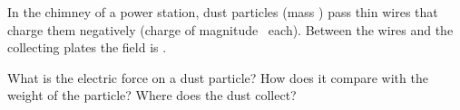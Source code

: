 In the chimney of a power station, dust particles (mass \mO) pass thin wires that charge them negatively (charge of magnitude \qO\ each). Between the wires and the collecting plates the field is \EO.

\begin{abcliste}
\abc What is the electric force on a dust particle?
\abc How does it compare with the weight of the particle?
\abc Where does the dust collect?
\end{abcliste}
